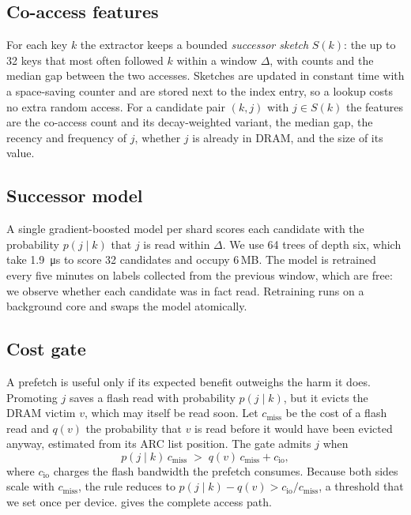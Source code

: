 \documentclass[10pt, twocolumn]{article}
\begin{document}
\subsection{Co-access features}
For each key $k$ the extractor keeps a bounded \emph{successor sketch}
$S(k)$: the up to 32 keys that most often followed $k$ within a window
$\Delta$, with counts and the median gap between the two accesses. Sketches
are updated in constant time with a space-saving counter and are stored
next to the index entry, so a lookup costs no extra random access. For a
candidate pair $(k, j)$ with $j \in S(k)$ the features are the co-access
count and its decay-weighted variant, the median gap, the recency and
frequency of $j$, whether $j$ is already in DRAM, and the size of its value.

\subsection{Successor model}
A single gradient-boosted model per shard scores each candidate with the
probability $p(j \mid k)$ that $j$ is read within $\Delta$. We use 64 trees
of depth six, which take \SI{1.9}{\micro\second} to score 32 candidates and
occupy 6\,MB. The model is retrained every five minutes on labels collected
from the previous window, which are free: we observe whether each candidate
was in fact read. Retraining runs on a background core and swaps the model
atomically.

\subsection{Cost gate}
\label{sec:gate}

A prefetch is useful only if its expected benefit outweighs the harm it
does. Promoting $j$ saves a flash read with probability $p(j \mid k)$, but
it evicts the DRAM victim $v$, which may itself be read soon. Let
$c_{\mathrm{miss}}$ be the cost of a flash read and $q(v)$ the probability
that $v$ is read before it would have been evicted anyway, estimated from
its ARC list position. The gate admits $j$ when
\begin{equation}
\label{eq:gate}
p(j \mid k)\,c_{\mathrm{miss}} \;>\; q(v)\,c_{\mathrm{miss}} + c_{\mathrm{io}},
\end{equation}
where $c_{\mathrm{io}}$ charges the flash bandwidth the prefetch consumes.
Because both sides scale with $c_{\mathrm{miss}}$, the rule reduces to
$p(j \mid k) - q(v) > c_{\mathrm{io}} / c_{\mathrm{miss}}$, a threshold that
we set once per device.  gives the complete access path.
\end{document}
